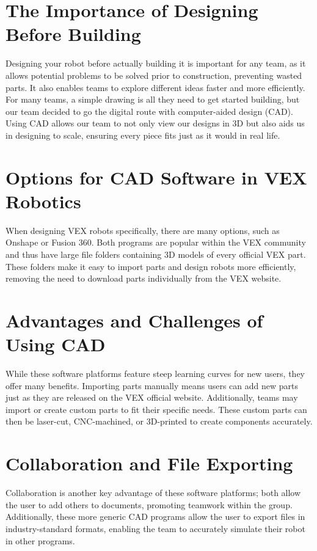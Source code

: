 \section*{The Importance of Designing Before Building}  
Designing your robot before actually building it is important for any team, as it allows potential problems to be solved prior to construction, preventing wasted parts. It also enables teams to explore different ideas faster and more efficiently. For many teams, a simple drawing is all they need to get started building, but our team decided to go the digital route with computer-aided design (CAD). Using CAD allows our team to not only view our designs in 3D but also aids us in designing to scale, ensuring every piece fits just as it would in real life.

\section*{Options for CAD Software in VEX Robotics}  
When designing VEX robots specifically, there are many options, such as Onshape or Fusion 360. Both programs are popular within the VEX community and thus have large file folders containing 3D models of every official VEX part. These folders make it easy to import parts and design robots more efficiently, removing the need to download parts individually from the VEX website.

\section*{Advantages and Challenges of Using CAD}  
While these software platforms feature steep learning curves for new users, they offer many benefits. Importing parts manually means users can add new parts just as they are released on the VEX official website. Additionally, teams may import or create custom parts to fit their specific needs. These custom parts can then be laser-cut, CNC-machined, or 3D-printed to create components accurately.

\section*{Collaboration and File Exporting}  
Collaboration is another key advantage of these software platforms; both allow the user to add others to documents, promoting teamwork within the group. Additionally, these more generic CAD programs allow the user to export files in industry-standard formats, enabling the team to accurately simulate their robot in other programs.

